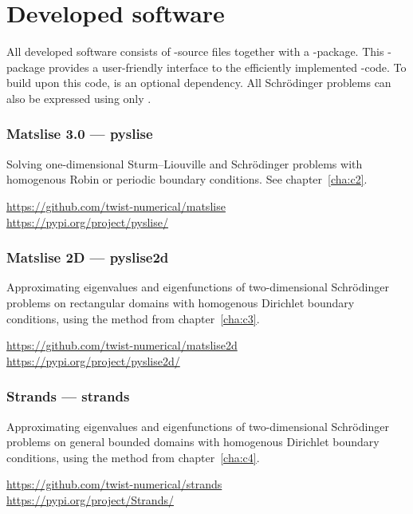 


\chapter*{Developed software}

All developed software consists of \cpp{}-source files together with a \lpython{}-package. This \lpython{}-package provides a user-friendly interface to the efficiently implemented \cpp{}-code. To build upon this code, \lpython{} is an optional dependency. All Schrödinger problems can also be expressed using only \cpp{}.

\subsection*{Matslise 3.0 --- pyslise}

Solving one-dimensional Sturm--Liouville and Schrödinger problems with homogenous Robin or periodic boundary conditions. See chapter~\ref{cha:c2}.

\url{https://github.com/twist-numerical/matslise} \\
\url{https://pypi.org/project/pyslise/}


\subsection*{Matslise 2D --- pyslise2d}

Approximating eigenvalues and eigenfunctions of two-dimensional Schrödinger problems on rectangular domains with homogenous Dirichlet boundary conditions, using the method from chapter~\ref{cha:c3}.

\url{https://github.com/twist-numerical/matslise2d} \\
\url{https://pypi.org/project/pyslise2d/}


\subsection*{Strands --- strands}

Approximating eigenvalues and eigenfunctions of two-dimensional Schrödinger problems on general bounded domains with homogenous Dirichlet boundary conditions, using the method from chapter~\ref{cha:c4}.

\url{https://github.com/twist-numerical/strands} \\
\url{https://pypi.org/project/Strands/}


\stopchapter
